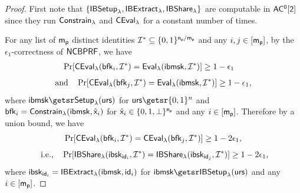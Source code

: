 \begin{proof}
 First note that $\{\mathsf{IBSetup}_{\lambda}, \mathsf{IBExtract}_{\lambda}, \mathsf{IBShare}_{\lambda}\}$ are computable in $\mathsf{AC^0[2]}$ since they run $\mathsf{Constrain}_{\lambda}$ and $\mathsf{CEval}_{\lambda}$ for a constant number of times.

	For any list of $\mathsf{m_p}$ distinct identities $\mathcal{I}^* \subseteq \{0, 1\}^{\mathsf{n_p}/\mathsf{m_p}}$ and any $i,j \in [\mathsf{m_p}]$, by the $\epsilon_1$-correctness of $\mathsf{NCBPRF}$, we have 
	\[\begin{split}\Pr[\mathsf{CEval}_{\lambda} & (\mathsf{bfk}_{i},\mathcal{I}^*) = \mathsf{Eval}_{\lambda}(\mathsf{ibmsk}, \mathcal{I}^*)] \geq 1-\epsilon_1
	\end{split}\]
	\[\begin{split}
	 \mbox{and}\hspace*{1em} \Pr[\mathsf{CEval}_{\lambda}\allowbreak(\mathsf{bfk}_{j}, \allowbreak \mathcal{I}^*) = \mathsf{Eval}_{\lambda}(\mathsf{ibmsk}, \mathcal{I}^*)] \geq 1-\epsilon_1,\end{split}\]
	where $\ibmsk \getsr \bprfsetup(\urs)$ for $\urs \getsr \bin^{n}$ and $\mathsf{bfk}_i = \mathsf{Constrain}_{\lambda}(\mathsf{ibmsk}, \hat{\mathsf{x}}_{i})$ for $\hat{\mathsf{x}}_i \in \{0, 1, \bot\}^{\mathsf{n_p}}$ and any $i \in [\mathsf{m_p}]$. Therefore by a union bound, we have 
	$$
	\Pr[\mathsf{CEval}_{\lambda} (\mathsf{bfk}_{i},\mathcal{I}^*)=\mathsf{CEval}_{\lambda}\allowbreak(\mathsf{bfk}_{j}, \allowbreak \mathcal{I}^*)]\geq 1-2\epsilon_1,
	$$
	$$\mbox{	i.e.,}\hspace*{1em} \Pr[\mathsf{IBShare}_{\lambda}(\mathsf{ibsk}_{\mathsf{id}_i}, \mathcal{I}^*) = \mathsf{IBShare}_{\lambda}(\mathsf{ibsk}_{\mathsf{id}_j}, \mathcal{I}^*)] \geq 1-2\epsilon_1,$$ where $\mathsf{ibsk}_{\mathsf{id}_i} = \mathsf{IBExtract}_{\lambda}(\mathsf{ibmsk}, \mathsf{id}_i)$ for $\ibmsk \getsr \ibsetup(\urs)$ and any $i \in [\mathsf{m_p}]$.


\end{proof}
